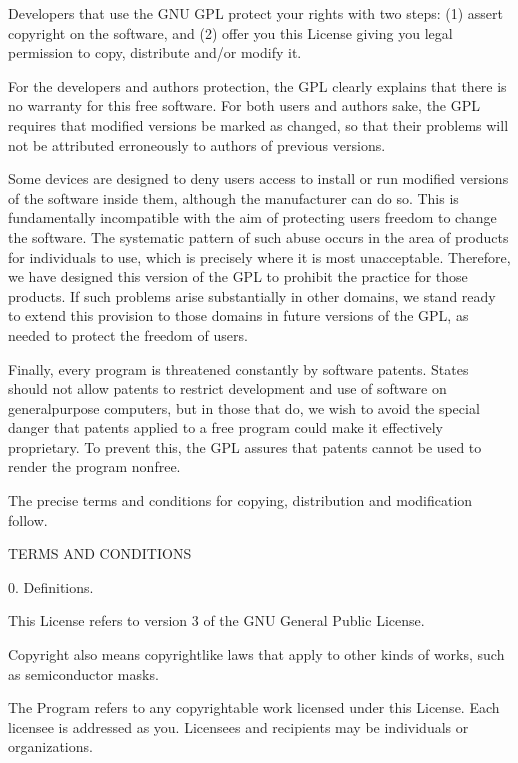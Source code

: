\documentclass[letterpaper,10pt,english]{sphinxmanual}
\begin{document}
\begin{sphinxVerbatim}[commandchars=\\\{\}]
  Developers that use the GNU GPL protect your rights with two steps:
(1) assert copyright on the software, and (2) offer you this License
giving you legal permission to copy, distribute and/or modify it.

  For the developers\PYGZsq{} and authors\PYGZsq{} protection, the GPL clearly explains
that there is no warranty for this free software.  For both users\PYGZsq{} and
authors\PYGZsq{} sake, the GPL requires that modified versions be marked as
changed, so that their problems will not be attributed erroneously to
authors of previous versions.

  Some devices are designed to deny users access to install or run
modified versions of the software inside them, although the manufacturer
can do so.  This is fundamentally incompatible with the aim of
protecting users\PYGZsq{} freedom to change the software.  The systematic
pattern of such abuse occurs in the area of products for individuals to
use, which is precisely where it is most unacceptable.  Therefore, we
have designed this version of the GPL to prohibit the practice for those
products.  If such problems arise substantially in other domains, we
stand ready to extend this provision to those domains in future versions
of the GPL, as needed to protect the freedom of users.

  Finally, every program is threatened constantly by software patents.
States should not allow patents to restrict development and use of
software on general\PYGZhy{}purpose computers, but in those that do, we wish to
avoid the special danger that patents applied to a free program could
make it effectively proprietary.  To prevent this, the GPL assures that
patents cannot be used to render the program non\PYGZhy{}free.

  The precise terms and conditions for copying, distribution and
modification follow.

                       TERMS AND CONDITIONS

  0. Definitions.

  \PYGZdq{}This License\PYGZdq{} refers to version 3 of the GNU General Public License.

  \PYGZdq{}Copyright\PYGZdq{} also means copyright\PYGZhy{}like laws that apply to other kinds of
works, such as semiconductor masks.

  \PYGZdq{}The Program\PYGZdq{} refers to any copyrightable work licensed under this
License.  Each licensee is addressed as \PYGZdq{}you\PYGZdq{}.  \PYGZdq{}Licensees\PYGZdq{} and
\PYGZdq{}recipients\PYGZdq{} may be individuals or organizations.


\end{sphinxVerbatim}
\end{document}
